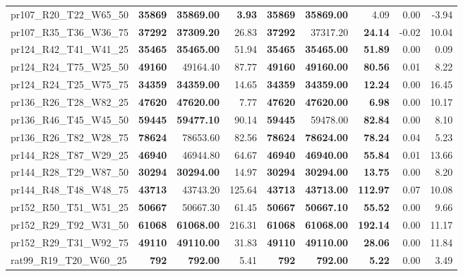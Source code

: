 \documentclass{singlecol-new}
\begin{document}
\begin{scriptsize}
\begin{longtable}{lrrrrrrrr}
		pr107\_R20\_T22\_W65\_50 & \textbf{35869} & \textbf{35869.00} & \textbf{3.93} & \textbf{35869} & \textbf{35869.00} & 4.09 & 0.00 & -3.94 \\
		pr107\_R35\_T36\_W36\_75 & \textbf{37292} & \textbf{37309.20} & 26.83 & \textbf{37292} & 37317.20 & \textbf{24.14} & -0.02 & 10.04 \\
		pr124\_R42\_T41\_W41\_25 & \textbf{35465} & \textbf{35465.00} & 51.94 & \textbf{35465} & \textbf{35465.00} & \textbf{51.89} & 0.00 & 0.09 \\
		pr124\_R24\_T75\_W25\_50 & \textbf{49160} & 49164.40 & 87.77 & \textbf{49160} & \textbf{49160.00} & \textbf{80.56} & 0.01 & 8.22 \\
		pr124\_R24\_T25\_W75\_75 & \textbf{34359} & \textbf{34359.00} & 14.65 & \textbf{34359} & \textbf{34359.00} & \textbf{12.24} & 0.00 & 16.45 \\
		pr136\_R26\_T28\_W82\_25 & \textbf{47620} & \textbf{47620.00} & 7.77 & \textbf{47620} & \textbf{47620.00} & \textbf{6.98} & 0.00 & 10.17 \\
		pr136\_R46\_T45\_W45\_50 & \textbf{59445} & \textbf{59477.10} & 90.14 & \textbf{59445} & 59478.00 & \textbf{82.84} & 0.00 & 8.10 \\
		pr136\_R26\_T82\_W28\_75 & \textbf{78624} & 78653.60 & 82.56 & \textbf{78624} & \textbf{78624.00} & \textbf{78.24} & 0.04 & 5.23 \\
		pr144\_R28\_T87\_W29\_25 & \textbf{46940} & 46944.80 & 64.67 & \textbf{46940} & \textbf{46940.00} & \textbf{55.84} & 0.01 & 13.66 \\
		pr144\_R28\_T29\_W87\_50 & \textbf{30294} & \textbf{30294.00} & 14.97 & \textbf{30294} & \textbf{30294.00} & \textbf{13.75} & 0.00 & 8.20 \\
		pr144\_R48\_T48\_W48\_75 & \textbf{43713} & 43743.20 & 125.64 & \textbf{43713} & \textbf{43713.00} & \textbf{112.97} & 0.07 & 10.08 \\
		pr152\_R50\_T51\_W51\_25 & \textbf{50667} & 50667.30 & 61.45 & \textbf{50667} & \textbf{50667.10} & \textbf{55.52} & 0.00 & 9.66 \\
		pr152\_R29\_T92\_W31\_50 & \textbf{61068} & \textbf{61068.00} & 216.31 & \textbf{61068} & \textbf{61068.00} & \textbf{192.14} & 0.00 & 11.17 \\
		pr152\_R29\_T31\_W92\_75 & \textbf{49110} & \textbf{49110.00} & 31.83 & \textbf{49110} & \textbf{49110.00} & \textbf{28.06} & 0.00 & 11.84 \\
		rat99\_R19\_T20\_W60\_25 & \textbf{792} & \textbf{792.00} & 5.41 & \textbf{792} & \textbf{792.00} & \textbf{5.22} & 0.00 & 3.49 \\

\end{longtable}
\end{scriptsize}
\end{document}
